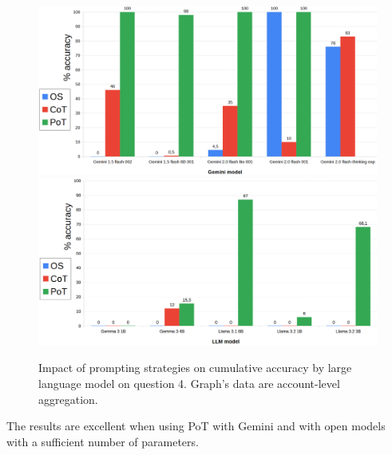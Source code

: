 \documentclass[12pt]{article}
\begin{document}

\begin{figure}[H]
    \centering
            \includegraphics[width=1\textwidth]{q102Gemini.png}
            \includegraphics[width=1\textwidth]{q102Other.png}
    \caption[Accuracy on Question 4 by LLM]{Impact of prompting strategies on cumulative accuracy by large language model on question 4. Graph's data are account-level aggregation.}
    \end{figure} 
The results are excellent when using PoT with Gemini and with open models with a sufficient number of parameters.\\

\vspace{2cm}

\end{document}
